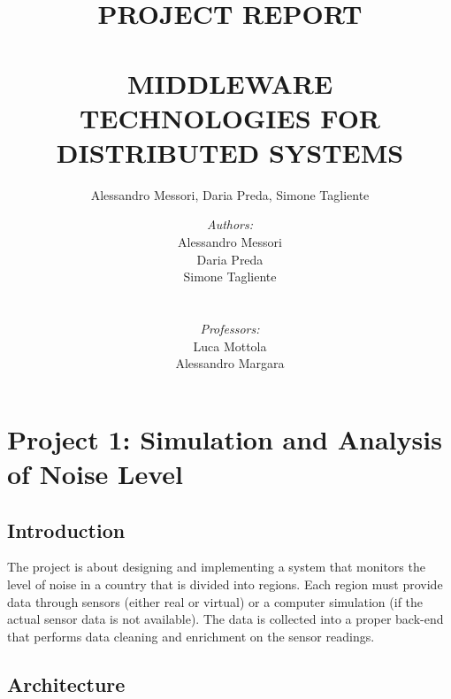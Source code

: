 \documentclass{article}
\author{Alessandro Messori, Daria Preda, Simone Tagliente}
\title{ \normalsize \textsc{PROJECT REPORT}
		\\ [2.0cm]
		\\
		\LARGE \textbf{\uppercase{MIDDLEWARE TECHNOLOGIES FOR DISTRIBUTED SYSTEMS}}
		\HRule \\ [0.5cm]
		\normalsize  \vspace*{5\baselineskip}}
\author{
        \textit{Authors:} \\
		Alessandro Messori \\
            Daria Preda \\  
            Simone Tagliente \\ 
            \\
            \\
            \textit{Professors:}\\
            Luca Mottola \\
            Alessandro Margara
            }
\begin{document}
\maketitle

\pagebreak

\tableofcontents

\pagebreak

\section{Project 1: Simulation and Analysis of Noise Level}
\subsection{Introduction}
The project is about designing and implementing a system that monitors the level of noise in a country that is divided into regions. Each region must provide data through sensors (either real or virtual) or a computer simulation (if the actual sensor data is not available). The data is collected into a proper back-end that performs data cleaning and enrichment on the sensor readings.
\subsection{Architecture}
\end{document}
